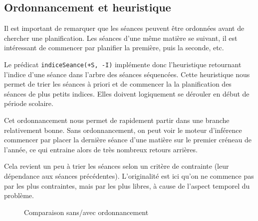 
\subsection{Ordonnancement et heuristique}

Il est important de remarquer que les séances peuvent être ordonnées avant de
chercher une planification. Les séances d'une même matière se suivant, il est
intéressant de commencer par planifier la première, puis la seconde, etc.

Le prédicat \texttt{indiceSeance(+S, -I)} implémente donc l'heuristique
retournant l'indice d'une séance dans l'arbre des séances séquencées. Cette
heuristique nous permet de trier les séances à priori et de commencer la
la planification des séances de plus petits indices. Elles doivent logiquement
se dérouler en début de période scolaire.

Cet ordonnancement nous permet de rapidement partir dans une branche
relativement bonne. Sans ordonnancement, on peut voir le moteur d'inférence
commencer par placer la dernière séance d'une matière sur le premier
créneau de l'année, ce qui entraine alors de très nombreux retours arrières.

Cela revient un peu à trier les séances selon un critère de contrainte (leur
dépendance aux séances précédentes). L'originalité est ici qu'on ne commence pas
par les plus contraintes, mais par les plus libres, à cause de l'aspect temporel
du problème.

\begin{figure}[H]
    \centering
    \caption{\label{fig:orderingcompare} Comparaison sans/avec ordonnancement}
\end{figure}

